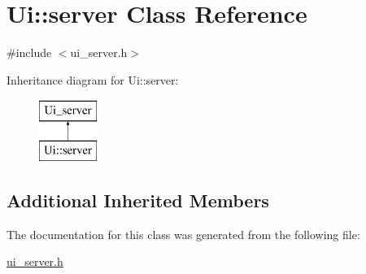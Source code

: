 \hypertarget{classUi_1_1server}{\section{Ui\-:\-:server Class Reference}
\label{classUi_1_1server}
}


{\ttfamily \#include $<$ui\-\_\-server.\-h$>$}

Inheritance diagram for Ui\-:\-:server\-:\begin{figure}[H]
\begin{center}
\leavevmode
\includegraphics[height=2.000000cm]{classUi_1_1server}
\end{center}
\end{figure}
\subsection*{Additional Inherited Members}


The documentation for this class was generated from the following file\-:\begin{DoxyCompactItemize}
\item 
\hyperlink{ui__server_8h}{ui\-\_\-server.\-h}\end{DoxyCompactItemize}
